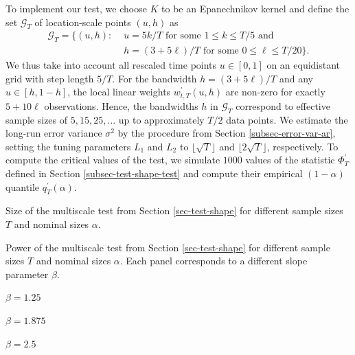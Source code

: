 To implement our test, we choose $K$ to be an Epanechnikov kernel and define the set $\mathcal{G}_T$ of location-scale points $(u,h)$ as
\begin{align}
\mathcal{G}_T = \big\{ (u, h): & \, \, u = 5k/T \text{ for some } 1 \le k \le T/5 \text{ and } \nonumber \\ & \, \, h = (3+5\ell)/T \text{ for some } 0 \le \ell \le T/20 \big\}. \label{grid-sim-app}
\end{align}
We thus take into account all rescaled time points $u \in [0,1]$ on an equidistant grid with step length $5/T$. For the bandwidth $h = (3 + 5\ell)/T$ and any $u \in [h,1-h]$, the local linear weights $w_{t,T}^\prime(u,h)$ are non-zero for exactly $5 + 10 \ell$ observations. Hence, the bandwidths $h$ in $\mathcal{G}_T$ correspond to effective sample sizes of $5, 15, 25, \ldots$ up to approximately $T/2$ data points. We estimate the long-run error variance $\sigma^2$ by the procedure from Section \ref{subsec-error-var-ar}, setting the tuning parameters $L_1$ and $L_2$ to $\lfloor \sqrt{T} \rfloor$ and $\lfloor 2\sqrt{T} \rfloor$, respectively. To compute the critical values of the test, we simulate $1000$ values of the statistic $\Phi^\prime_T$ defined in Section \ref{subsec-test-shape-test} and compute their empirical $(1-\alpha)$ quantile $q_T^\prime(\alpha)$. 


\begin{table}[t]
\footnotesize{
\begin{center}
\caption{Size of the multiscale test from Section \ref{sec-test-shape} for different sample sizes $T$ and nominal sizes $\alpha$.}
\label{tab:size_shape}
\renewcommand{\arraystretch}{1.2}

\end{center}}
\footnotesize{
\begin{center}
\caption{Power of the multiscale test from Section \ref{sec-test-shape} for different sample sizes $T$ and nominal sizes $\alpha$. Each panel corresponds to a different slope parameter $\beta$.}\label{tab:power_shape}
\begin{subtable}[b]{0.32\textwidth}
\centering
\caption{$\beta = 1.25$}\label{tab:power_050_ll_shape}
\renewcommand{\arraystretch}{1.2}

\end{subtable}
\begin{subtable}[b]{0.32\textwidth}
\centering
\caption{$\beta = 1.875$}\label{tab:power_075_ll_shape}
\renewcommand{\arraystretch}{1.2}

\end{subtable}
\begin{subtable}[b]{0.32\textwidth}
\centering
\caption{$\beta = 2.5$}\label{tab:power_100_ll_shape}
\renewcommand{\arraystretch}{1.2}

\end{subtable}
\end{center}}
\vspace{-0.4cm}
\end{table}


